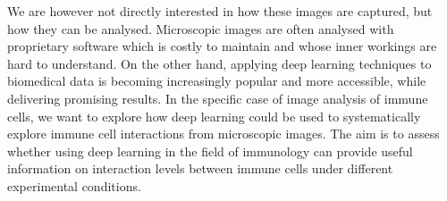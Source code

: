 We are however not directly interested in how these images are captured, but how they can be analysed. Microscopic images are often analysed with proprietary software which is costly to maintain and whose inner workings are hard to understand. On the other hand, applying deep learning techniques to biomedical data is becoming increasingly popular and more accessible, while delivering promising results. In the specific case of image analysis of immune cells, we want to explore how deep learning could be used to systematically explore immune cell interactions from microscopic images. The aim is to assess whether using deep learning in the field of immunology can provide useful information on interaction levels between immune cells under different experimental conditions.
